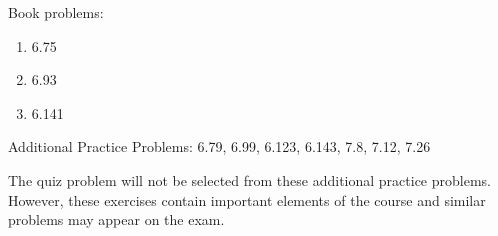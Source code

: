 
Book problems:
\begin{enumerate}
  \item 6.75
  \item 6.93
  \item 6.141
\end{enumerate}

Additional Practice Problems: 6.79, 6.99, 6.123, 6.143, 7.8, 7.12, 7.26

\noindent The quiz problem will not be selected from these additional practice problems.  However, these exercises contain important elements of the course and similar problems may appear on the exam.

\iftoggle{flagSoln}{%
\vspace{.5cm}
\rule{\textwidth}{.4pt}
\vspace{.5cm}
\textbf{Solution:}
\begin{enumerate}
  \item[6.75] $F_{BD} = 1750$ N (C), $C_x = 1400$ N left, $C_y = 700$ N down
  \item[6.93] $A_x = 176.3$ lb left, $A_y = 60.0$ lb down, $G_x = 56.3$ lb right, $G_y = 510$ lb up
  \item[6.141] $C = 4.65$ kips right, $E = 6.14$ kips $40.7^\circ$ down from the left
\end{enumerate}
}{%
}%
